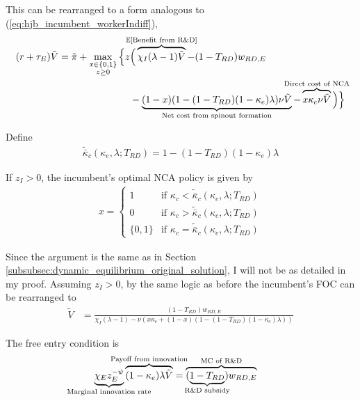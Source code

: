 \documentclass[11pt,english]{article}
\theoremstyle{remark}
\begin{document}
This can be rearranged to a form analogous to (\ref{eq:hjb_incumbent_workerIndiff}),
\begin{align}
	(r + \tau_E) \tilde{V} = \tilde{\pi} + \max_{\substack{x \in \{0,1\} \\ z \ge 0}} \Big\{z &\Big( \overbrace{\chi_I (\lambda - 1) \tilde{V}}^{\mathclap{\mathbb{E}[\textrm{Benefit from R\&D}]}}- (1-T_{RD}) w_{RD,E} \\
	&-  \underbrace{(1-x)(1 - (1-T_{RD})(1-\kappa_{e})\lambda)\nu \tilde{V}}_{\mathclap{\text{Net cost from spinout formation}}} - \overbrace{x \kappa_{c} \nu \tilde{V}}^{\mathclap{\text{Direct cost of NCA}}}\Big) \Big\} \label{eq:hjb_incumbent_RDsubsidy_2}
\end{align}

Define
\begin{align}
	\tilde{\bar{\kappa}}_c(\kappa_e,\lambda;T_{RD}) = 1 - (1-T_{RD})(1-\kappa_e)\lambda
\end{align} 

If $z_I > 0$, the incumbent's optimal NCA policy is given by 
\begin{align}
x = \begin{cases}
1 & \textrm{if } \kappa_{c} < \tilde{\bar{\kappa}}_c (\kappa_e, \lambda;T_{RD}) \\
0 & \textrm{if } \kappa_{c} > \tilde{\bar{\kappa}}_c (\kappa_e, \lambda;T_{RD})\\
\{0,1\} & \textrm{if } \kappa_c = \tilde{\bar{\kappa}}_c (\kappa_e, \lambda;T_{RD})
\end{cases} \label{eq:nca_policy_RDsubsidy}
\end{align}

Since the argument is the same as in Section \ref{subsubsec:dynamic_equilibrium_original_solution}, I will not be as detailed in my proof. Assuming $z_I > 0$, by the same logic as before the incumbent's FOC can be rearranged to
\begin{align}
	\tilde{V} &= \frac{(1-T_{RD})w_{RD,E}}{\chi_I(\lambda -1) - \nu (x\kappa_c + (1-x)(1 - (1-T_{RD})(1-\kappa_e)\lambda)) } \label{eq:hjb_incumbent_foc_RDsubsidy}
\end{align}

The free entry condition is
\begin{align}
\underbrace{\chi_E z_E^{-\psi}}_{\mathclap{\text{Marginal innovation rate}}} \overbrace{(1-\kappa_e) \lambda \tilde{V}}^{\mathclap{\text{Payoff from innovation}}} &= \overbrace{(\underbrace{1-T_{RD}}_{\mathclap{\text{R\&D subsidy}}})w_{RD,E}}^{\mathclap{\text{MC of R\&D}}} \label{eq:free_entry_condition_RDsubsidy}
\end{align}
\end{document}
